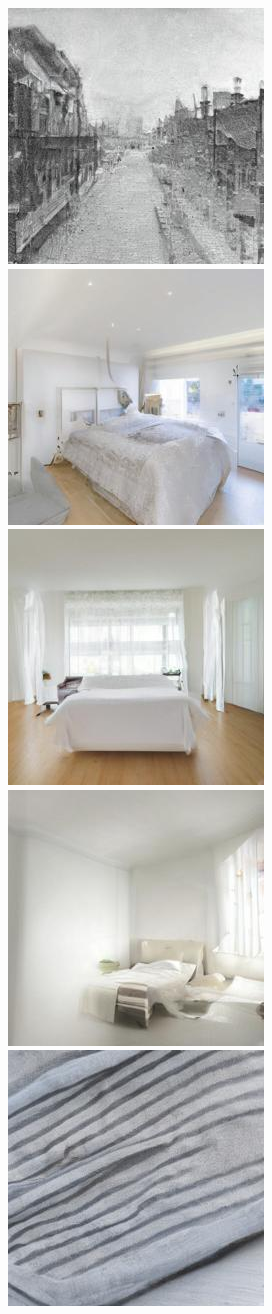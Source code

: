 \begin{figure}[h!]
\begin{subfigure}[t]{0.32\linewidth}
	\includegraphics[width=0.320\linewidth]{figs/samples_appendix_3/base_cfg_2_ode_prompt_14_image_3.jpg}\\ 
	\includegraphics[width=0.320\linewidth]{figs/samples_appendix_3/base_cfg_2_ode_prompt_19_image_1.jpg}\;%
	\includegraphics[width=0.320\linewidth]{figs/samples_appendix_3/base_cfg_2_ode_prompt_19_image_2.jpg}\;%
	\includegraphics[width=0.320\linewidth]{figs/samples_appendix_3/base_cfg_2_ode_prompt_19_image_3.jpg}\\ 
	\includegraphics[width=0.320\linewidth]{figs/samples_appendix_3/base_cfg_2_ode_prompt_28_image_1.jpg}\;%

\end{subfigure}
\end{figure}
